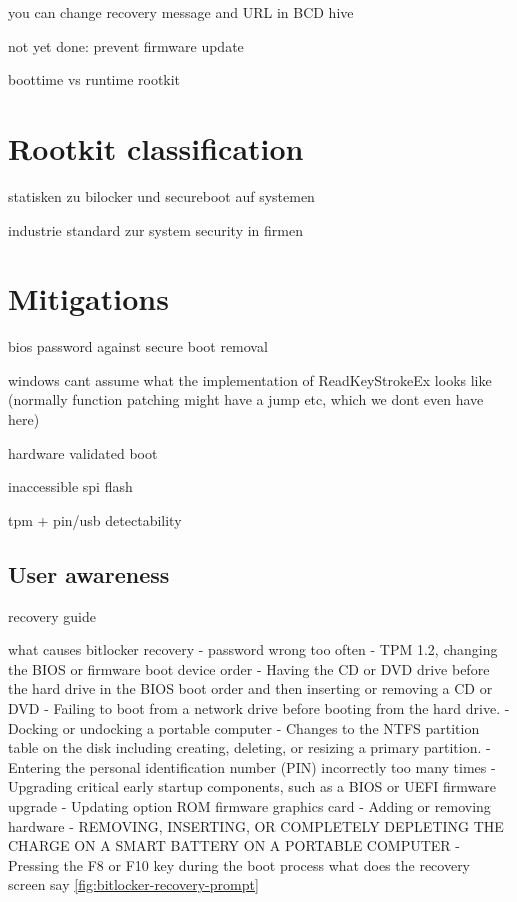 you can change recovery message and URL in BCD hive

not yet done: prevent firmware update


boottime vs runtime rootkit

\section{Rootkit classification}

statisken zu bilocker und secureboot auf systemen

industrie standard zur system security in firmen

\section{Mitigations}

bios password against secure boot removal

windows cant assume what the implementation of ReadKeyStrokeEx looks like (normally function patching might have a jump etc, which we dont even have here)

hardware validated boot

inaccessible spi flash

tpm + pin/usb detectability

\subsection{User awareness}



recovery guide

what causes bitlocker recovery
- password wrong too often
- TPM 1.2, changing the BIOS or firmware boot device order
- Having the CD or DVD drive before the hard drive in the BIOS boot order and then inserting or removing a CD or DVD
- Failing to boot from a network drive before booting from the hard drive.
- Docking or undocking a portable computer
- Changes to the NTFS partition table on the disk including creating, deleting, or resizing a primary partition.
- Entering the personal identification number (PIN) incorrectly too many times
- Upgrading critical early startup components, such as a BIOS or UEFI firmware upgrade
- Updating option ROM firmware graphics card
- Adding or removing hardware
- REMOVING, INSERTING, OR COMPLETELY DEPLETING THE CHARGE ON A SMART BATTERY ON A PORTABLE COMPUTER
- Pressing the F8 or F10 key during the boot process
what does the recovery screen say \autoref{fig:bitlocker-recovery-prompt}

